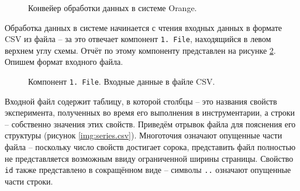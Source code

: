 \begin{figure}[H]
    \caption{Конвейер обработки данных в системе Orange.}
    \label{img:series30}
\end{figure}

Обработка данных в системе начинается с чтения входных данных в формате CSV из файла -- за это отвечает компонент \texttt{1. File}, находящийся в левом верхнем углу схемы. Отчёт по этому компоненту представлен на рисунке \ref{img:1-File}. Опишем формат входного файла.

\begin{figure}[H]
    \caption{Компонент \texttt{1. File}. Входные данные в файле CSV.}
    \label{img:1-File}
\end{figure}

Входной файл содержит таблицу, в которой столбцы -- это названия свойств эксперимента, полученных во время его выполнения в инструментарии, а строки -- собственно значения этих свойств. Приведём отрывок файла для пояснения его структуры (рисунок \ref{img:series.csv}). Многоточия означают опущенные части файла -- поскольку число свойств достигает сорока, представить файл полностью не представляется возможным ввиду ограниченной ширины страницы. Свойство \texttt{id} также представлено в сокращённом виде -- символы \texttt{..} означают опущенные части строки.


